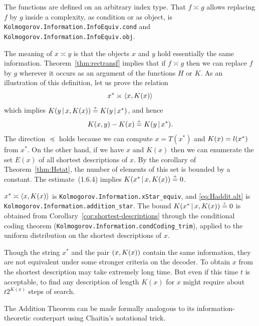 \begin{formalization}
The functions are defined on an arbitrary index type. That \( f \asymp g \) allows replacing
\( f \) by \( g \) inside a complexity, as condition or as object, is
\texttt{Kolmogorov.Information.InfoEquiv.cond} and \texttt{Kolmogorov.Information.InfoEquiv.obj}.
\end{formalization}

The meaning of \( x \asymp y \) is that the objects \( x \) and \( y \) hold
essentially the same information. 
Theorem~\ref{thm:rectransf}
implies that if \( f\asymp g \) then we can replace \( f \) by \( g \) wherever
it occurs as an argument of the functions \( H \) or \( K \).  
As an illustration of this definition, let us prove the relation
 \[ 	x^{*} \asymp {\mathopen\langle  x, K(x) \mathclose\rangle} 
 \]
  which implies \( K(y \,\vert\, x, K(x)) \stackrel{{}_+}{=} K(y \,\vert\, x^{*}) \), and hence 
 \begin{equation} 	K(x,y) - K(x) \stackrel{{}_+}{=} K(y \,\vert\, x^{*}).
\label{eq:Haddit.alt} 
 \end{equation}
  The direction \( \preceq \) holds because we can compute \( x=T(x^{*}) \)
and \( K(x)=l(x^{*}) \) from \( x^{*} \). 
On the other hand, if we have \( x \)
and \( K(x) \) then we can enumerate the set \( E(x) \) of all shortest
descriptions of \( x \). 
By the corollary of Theorem~\ref{thm:Hstat}, the
number of elements of this set is bounded by a constant. 
The estimate~(1.6.4) implies \( K(x^{*} \,\vert\, x,K(x)) \stackrel{{}_+}{=} 0 \).

\begin{formalization}
\( x^{*} \asymp {\mathopen\langle x, K(x)\mathclose\rangle} \) is \texttt{Kolmogorov.Information.xStar\_equiv}, and
\eqref{eq:Haddit.alt} is \texttt{Kolmogorov.Information.addition\_star}. The bound
\( K(x^{*} \,\vert\, x, K(x)) \stackrel{{}_+}{=} 0 \) is obtained from
Corollary~\ref{cor:shortest-descriptions} through the conditional coding theorem
(\texttt{Kolmogorov.Information.condCoding\_trim}), applied to the uniform distribution on the
shortest descriptions of \( x \).
\end{formalization}

Though the string \( x^{*} \) and the pair \( ( x, K(x) ) \) contain the
same information, they are not equivalent under some stronger
criteria on the decoder. 
To obtain \( x \) from the shortest description
may take extremely long time. 
But even if this time \( t \) is
acceptable, to find any description of length \( K(x) \) for \( x \) might
require about \( t2^{K(x)} \) steps of search. 

The Addition Theorem can be made formally analogous to its 
information-theoretic couterpart using Chaitin's notational trick. 

